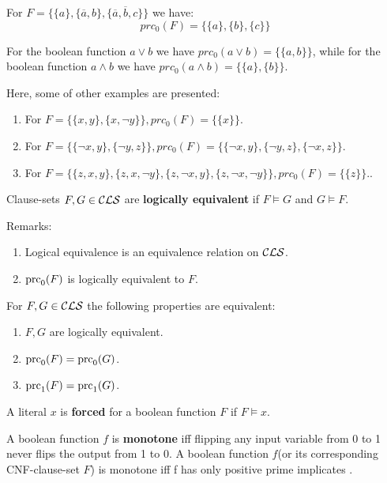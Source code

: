 \documentclass[12pt]{book}
\begin{document}
\begin{examp}\label{exp:aaa}
      For $F = \{ \{a\}, \{ \overline a, b \}, \{ \overline a, \overline b, c \} \}$ we have:
      $$ prc_0(F) = \{ \{a\}, \{ b \}, \{ c \} \} $$
\end{examp}

\begin{examp}\label{exp:imp3}
      For the boolean function $ a \vee b$ we have $prc_0(a \vee b) = \{ \{a, b \} \}$, while for the boolean function 
	  $a \wedge b$ we have $prc_0(a \wedge b) = \{ \{ a \}, \{b\}\}$.
\end{examp}

\begin{examp}\label{exp:bbb}
      Here, some of other examples are presented:
	  \begin{enumerate}
	        \item For $F = \{\{x, y\} , \{x,\neg y\}\}, prc_0(F) = \{\{x\}\}$.
			\item For $F = \{\{ \neg x, y\} , \{ \neg y, z\}\}, prc_0(F) = \{\{\neg x, y\} , \{\neg y, z\} , \{\neg x, z\}\}$.
			\item For $F = \{\{z, x, y\} , \{z, x, \neg y\} , \{z, \neg x, y\} , \{z,\neg x, \neg y\}\}, prc_0(F) = \{\{z\}\}.$.
      \end{enumerate}
\end{examp}

\begin{defi}\label{def:logequiv}
  Clause-sets $F, G \in \mathcal{CLS}$ are \textbf{logically equivalent} if $F \models G$ and $G \models F$.
\end{defi}
Remarks:
\begin{enumerate}
\item Logical equivalence is an equivalence relation on $\mathcal{CLS}$.
\item $\operatorname{prc}_0(F)$ is logically equivalent to $F$.
\end{enumerate}

\begin{lem}\label{lem:logequiv}
  For $F, G \in \mathcal{CLS}$ the following properties are equivalent:
  \begin{enumerate}
  \item $F, G$ are logically equivalent.
  \item $\operatorname{prc}_0(F) = \operatorname{prc}_0(G)$.
  \item $\operatorname{prc}_1(F) = \operatorname{prc}_1(G)$.
  \end{enumerate}
\end{lem}

\begin{defi}\label{def:forced1}
      A literal $x$ is \textbf{forced} for a boolean function $F$ if $F \models x$.
\end{defi}
\begin{defi}\label{def:imp3}
      A boolean function $f$ is \textbf{monotone} iff flipping any input variable from 0 to 1 never flips the output from 1 to 0.
	  A boolean function $f$(or its corresponding CNF-clause-set $F$) is monotone iff f has only positive prime implicates \cite{h8}.
\end{defi}
\end{document}
